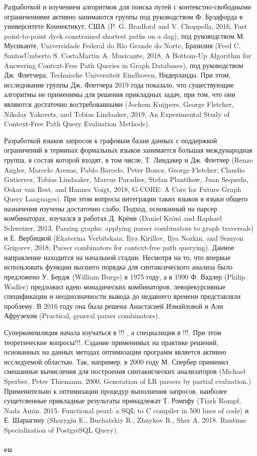 \documentclass[12pt]{article}  %
\theoremstyle{remark}
\begin{document}
Разработкой и изучением алгоритмов для поиска путей с контекстно-свободными ограничениями активно занимаются группы под руководством Ф. Брэдфорда в университете Коннектикут, США (P. G. Bradford and V. Choppella, 2016, Fast point-to-point dyck constrained shortest paths on a dag), под руководством М. Мусиканте, Universidade Federal do Rio Grande do Norte, Бразилия (Fred C. SantosUmberto S. CostaMartin A. Musicante, 2018, A Bottom-Up Algorithm for Answering Context-Free Path Queries in Graph Databases), под руководством Дж. Флетчера, Technische Universiteit Eindhoven, Нидерланды. При этом, исследование группы Дж. Флетчера 2019 года показало, что существующие алгоритмы не применимы для решения прикладных задач, при том, что они являются достаточно востребованными (Jochem Kuijpers, George Fletcher, Nikolay Yakovets, and Tobias Lindaaker, 2019, An Experimental Study of Context-Free Path Query Evaluation Methods).

Разработкой языков запросов к графовым базам данных с поддержкой ограничений в терминах формальных языков занимается большая международная группа, в состав которой входят, в том числе, Т. Линдакер и Дж. Флетчер (Renzo Angles, Marcelo Arenas, Pablo Barcelo, Peter Boncz, George Fletcher, Claudio Gutierrez, Tobias Lindaaker, Marcus Paradies, Stefan Plantikow, Juan Sequeda, Oskar van Rest, and Hannes Voigt, 2018, G-CORE: A Core for Future Graph Query Languages). При этом вопросы интеграции таких языков в языки общего назначения изучены достаточно слабо. Подход, основанный на парсер комбинаторах, изучался в работах Д. Крёни (Daniel Kröni and Raphael Schweizer, 2013, Parsing graphs: applying parser combinators to graph traversals) и Е. Вербицкой (Ekaterina Verbitskaia, Ilya Kirillov, Ilya Nozkin, and Semyon Grigorev, 2018, Parser combinators for context-free path querying). Данное направление находится на начальной стадии.
Несмотря на то, что впервые использовать функции высшего порядка для синтаксического анализа было предложено У. Бердж (William Burge) в 1975 году, а в 1990 Ф. Вадлер (Philip Wadler) предложил идею монадических комбинаторов, леворекурсивные спецификации и неоднозначности вывода до недавнего времени представляли проблему.
В 2016 году она была решена Анастасией Измайловой и Али Афрузехом (Practical, general parser combinators).

Суперкомпиляция начала изучаться в !!! , а специалиция в !!!. При этом теоретические вопросы!!!. Сздание применимых на практике решений, основанных на данных методах оптимизации программ является активно исследуемой областью. Так, например, в 2000 году М. Спербер применил смешанные вычисления для построения синтакисческих анализаторов (Michael Sperber, Peter Thiemann. 2000. Generation of LR parsers by partial evaluation.) Применительно к оптимизации процедур выполнения запросов, наиболее сущетсвенные прикладные результаты принадлежат Т. Ромпфу (Tiark Rompf, Nada Amin. 2015. Functional pearl: a SQL to C compiler in 500 lines of code) и Е. Шарыгину (Sharygin E., Buchatskiy R., Zhuykov R., Sher A. 2018. Runtime Specialization of PostgreSQL Query).
\\
\\
\textbf{en}\\
\end{document}
